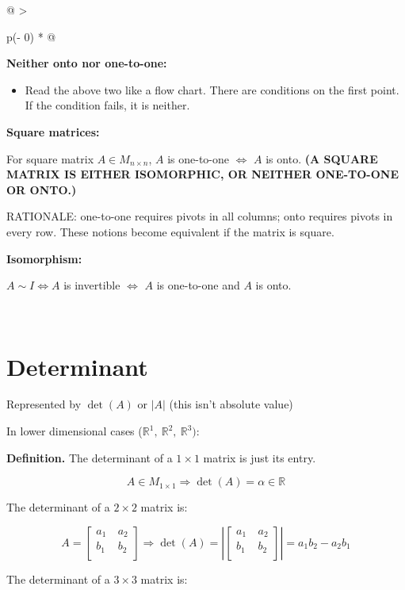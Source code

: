 \documentclass[
]{article}
\begin{document}
\begin{longtable}[]{@{}
  >{\raggedright\arraybackslash}p{(\columnwidth - 0\tabcolsep) * }@{}}
\begin{minipage}[b]{\linewidth}
\textbf{Neither onto nor one-to-one:}

\begin{itemize}
\item
  Read the above two like a flow chart. There are conditions on the
  first point. If the condition fails, it is neither.
\end{itemize}

\textbf{Square matrices:}

For square matrix $A \in M_{n \times n}$, $A$ is one-to-one
$\Leftrightarrow$ $A$ is onto. \textbf{(A SQUARE MATRIX IS EITHER
ISOMORPHIC, OR NEITHER ONE-TO-ONE OR ONTO.)}

RATIONALE: one-to-one requires pivots in all columns; onto requires
pivots in every row. These notions become equivalent if the matrix is
square.

\textbf{Isomorphism:}

$A\sim I \Leftrightarrow A$ is invertible $\Leftrightarrow$ $A$ is
one-to-one and $A$ is onto.
\end{minipage} \\
\midrule
\endhead
\bottomrule
\end{longtable}


\section{Determinant}

Represented by $\det(A)$ or $|A|$ (this isn't absolute value)

In lower dimensional cases
($\mathbb{R}^{1},\ \mathbb{R}^{2},\ \mathbb{R}^{3})$:

\textbf{Definition.} The determinant of a $1 \times 1$ matrix is just
its entry.

$$A \in M_{1 \times 1} \Rightarrow \det(A) = \alpha\mathbb{\in R}$$

The determinant of a $2 \times 2$ matrix is:

$$A = \begin{bmatrix}
a_{1}\  & a_{2} \\
b_{1} & b_{2} \\
\end{bmatrix} \Rightarrow \det(A) = \left| \begin{bmatrix}
a_{1}\  & a_{2} \\
b_{1} & b_{2} \\
\end{bmatrix} \right| = a_{1}b_{2} - a_{2}b_{1}$$

The determinant of a $3 \times 3$ matrix is:
\end{document}
